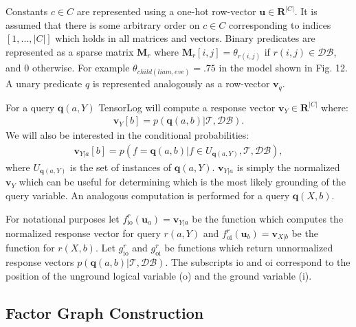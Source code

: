 \documentclass[11pt]{article}
\begin{document}
Constants $c \in C$ are represented using a one-hot row-vector $\textbf{u} \in \mathbf{R}^{|C|}$.  It is assumed that there is some arbitrary order on $c \in C$ corresponding to indices $[1, ..., |C|]$ which holds in all matrices and vectors.  Binary predicates are represented as a sparse matrix $\textbf{M}_r$ where $\textbf{M}_r[i, j] = \theta_{r(i, j)}$ if $r(i, j) \in \mathcal{DB}$, and 0 otherwise.  For example $\theta_{child(liam, eve)} = .75$ in the model shown in Fig. 12.  A unary predicate $q$ is represented analogously as a row-vector $\textbf{v}_q$.

For a query $\textbf{q}(a, Y)$ TensorLog will compute a response vector $\textbf{v}_Y \in \mathbf{R}^{|C|}$ where:
\begin{gather*}
\textbf{v}_{Y}[b] = p( \textbf{q}(a, b) | \mathcal{T}, \mathcal{DB}).
\end{gather*}  We will also be interested in the conditional probabilities:
\begin{gather*}
\textbf{v}_{Y|a}[b] = p( f = \textbf{q}(a, b) |f \in U_{\textbf{q}(a, Y)}, \mathcal{T}, \mathcal{DB}),
\end{gather*} where $U_{\textbf{q}(a, Y)}$ is the set of instances of $\textbf{q}(a, Y)$.  $\textbf{v}_{Y|a}$ is simply the normalized $\textbf{v}_{Y}$ which can be useful for determining which is the most likely grounding of the query variable.  An analogous computation is performed for a query $\textbf{q}(X, b)$.  

For notational purposes let $f_{\text{io}}^{r}(\textbf{u}_a) = \textbf{v}_{Y|a}$ be the function which computes the normalized response vector for query $r(a, Y)$ and $f_{\text{oi}}^{r}(\textbf{u}_b) = \textbf{v}_{X|b}$ be the function for $r(X, b)$.  Let $g_{\text{io}}^{r}$ and $g_{\text{oi}}^{r}$ be functions which return unnormalized response vectors $p( \textbf{q}(a, b) | \mathcal{T}, \mathcal{DB})$.  The subscripts io and oi correspond to the position of the unground logical variable (o) and the ground variable (i).  

\subsection{Factor Graph Construction}
\end{document}
